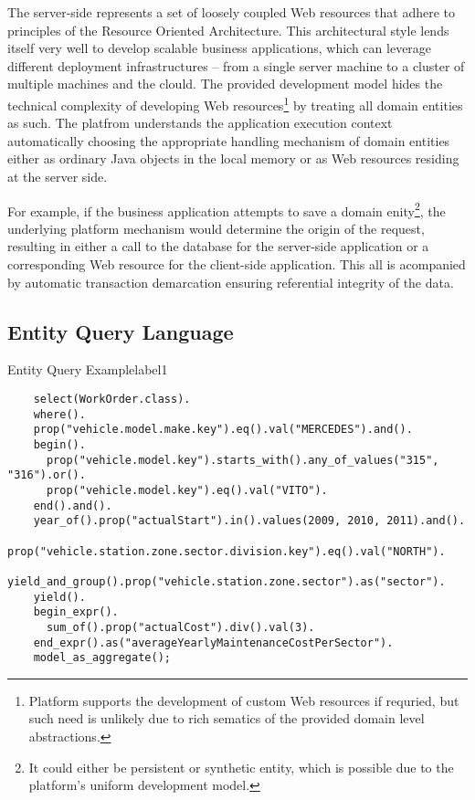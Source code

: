   The server-side represents a set of loosely coupled Web resources that adhere to principles of the Resource Oriented Architecture.
  This architectural style lends itself very well to develop scalable business applications, which can leverage different deployment infrastructures -- from a single server machine to a cluster of multiple machines and the clould.
  The provided development model hides the technical complexity of developing Web resources\footnote{Platform supports the development of custom Web resources if requried, but such need is unlikely due to rich sematics of the provided domain level abstractions.} by treating all domain entities as such.
  The platfrom understands the application execution context automatically choosing the appropriate handling mechanism of domain entities either as ordinary Java objects in the local memory or as Web resources residing at the server side.
  
  For example, if the business application attempts to save a domain enity\footnote{It could either be persistent or synthetic entity, which is possible due to the platform's uniform development model.}, the underlying platform mechanism would determine the origin of the request, resulting in either a call to the database for the server-side application or a corresponding Web resource for the client-side application.
  This all is acompanied by automatic transaction demarcation ensuring referential integrity of the data.

  

  \subsection{Entity Query Language}
  
  \begin{code}{Entity Query Example}{label1}
  \begin{lstlisting}
    select(WorkOrder.class).
    where().
    prop("vehicle.model.make.key").eq().val("MERCEDES").and().
    begin().
      prop("vehicle.model.key").starts_with().any_of_values("315", "316").or().
      prop("vehicle.model.key").eq().val("VITO").
    end().and().
    year_of().prop("actualStart").in().values(2009, 2010, 2011).and().
    prop("vehicle.station.zone.sector.division.key").eq().val("NORTH").
    yield_and_group().prop("vehicle.station.zone.sector").as("sector").
    yield().
    begin_expr().
      sum_of().prop("actualCost").div().val(3).
    end_expr().as("averageYearlyMaintenanceCostPerSector").
    model_as_aggregate();
  \end{lstlisting}
  \end{code}
  
